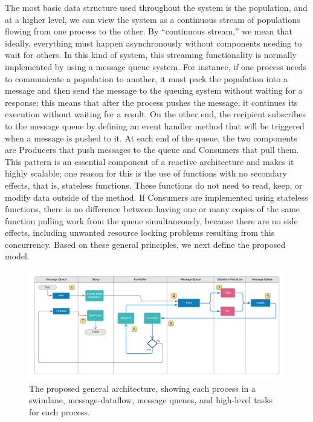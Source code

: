 \documentclass[review]{elsarticle}
\begin{document}
The most basic data structure used throughout the system is the population, and at a higher
level, we can view the system as a continuous stream of populations
flowing from one process to the other. By ``continuous stream,'' we mean that ideally,
everything must happen asynchronously without components needing to wait for
others. In this kind of system, this streaming functionality is normally
implemented by using a message queue system. For instance, if one process needs
to communicate a population to another, it must pack the population into
a message and then send the message 
to the queuing system without waiting for a response; this
means that after the process pushes the message, it continues its execution
without waiting for a result. On the other end, the recipient subscribes to the
message queue by defining an event handler method that will be triggered when a
message is pushed to it. At each end of the queue, the two components are 
Producers that push messages to the queue and Consumers that pull them. This
pattern is an essential component of a reactive architecture and makes
it highly scalable; one reason for this is the use of functions
with no secondary effects, that is,
stateless functions. These functions do not need to read, keep, or modify data outside of the method. If
Consumers are implemented using stateless functions, there is no difference
between having one or many copies of the same function pulling work from the queue 
simultaneously, because there are no side effects, including unwanted resource
locking problems resulting from this concurrency.
Based on these general principles, we next define the proposed model.


\begin{figure}
    \centering
    \includegraphics[width=\textwidth]{KafkEOsmall}
    \caption{The proposed general architecture, 
     showing each process in a swimlane, message-dataflow,
     message queues, and high-level tasks for each process.} 
    \label{fig:kafkEO}
\end{figure}
\end{document}
